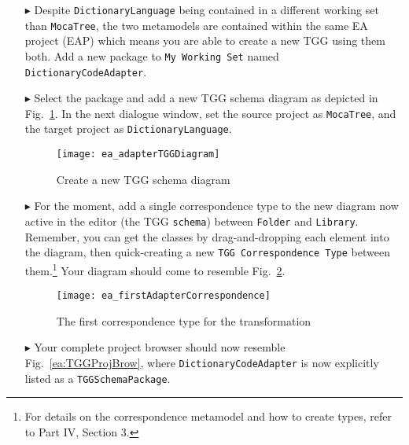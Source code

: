\begin{itemize}

\item[$\blacktriangleright$] Despite \texttt{DictionaryLanguage} being contained in a different working set than \texttt{MocaTree}, the two
metamodels are contained within the same EA project (EAP) which means you are able to create a new TGG using them both. Add a new package to \texttt{My
Working Set} named \texttt{Dict\-ion\-ary\-Code\-Adap\-ter}.

\item[$\blacktriangleright$] Select the package and add a new TGG schema diagram as depicted in Fig.~\ref{ea:newTGGDiagram}. In the next dialogue window,
set the source project as \texttt{MocaTree}, and the target project as \texttt{Dict\-ion\-ary\-Lang\-uage}.

\begin{figure}[h!]
\begin{center}
  \texttt{[image: ea\_adapterTGGDiagram]}
  \caption{Create a new TGG schema diagram}
  \label{ea:newTGGDiagram}
\end{center}
\end{figure}

\item[$\blacktriangleright$] For the moment, add a single correspondence type to the new diagram now active in the editor (the TGG \texttt{schema}) between
\texttt{Folder} and \texttt{Library}. Remember, you can get the classes by drag-and-dropping each element into the diagram, then quick-creating a new
\texttt{TGG~Cor\-res\-pon\-dence~Type} between them.\footnote{For details on the correspondence metamodel and how to create types, refer to Part IV, Section 3.}
Your diagram should come to resemble Fig.~\ref{ea:firstCorrType}.

\vspace{0.5cm}

\begin{figure}[htpb]
\begin{center}
  \texttt{[image: ea\_firstAdapterCorrespondence]}
  \caption{The first correspondence type for the transformation}
  \label{ea:firstCorrType}
\end{center}
\end{figure}

\newpage

\item[$\blacktriangleright$] Your complete project browser should now resemble Fig.~\ref{ea:TGGProjBrow}, where \texttt{Dict\-ion\-ary\-Code\-Adap\-ter} is now
explicitly listed as a \texttt{TGGSchemaPackage}.


\end{itemize}
